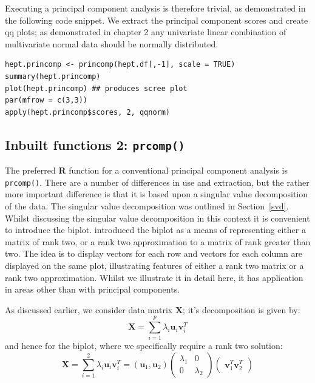 Executing a principal component analysis is therefore trivial, as demonstrated in the following code snippet.   We extract the principal component scores and create qq plots; as demonstrated in chapter 2 any univariate linear combination of multivariate normal data should be normally distributed.  

\singlespacing
\begin{verbatim}
hept.princomp <- princomp(hept.df[,-1], scale = TRUE)
summary(hept.princomp)
plot(hept.princomp) ## produces scree plot
par(mfrow = c(3,3))
apply(hept.princomp$scores, 2, qqnorm)
\end{verbatim}
\onehalfspacing


\subsection{Inbuilt functions 2: \texttt{prcomp()}}
\label{prcomp}

The preferred \textbf{R} function for a conventional principal component analysis is \verb+prcomp()+.   There are a number of differences in use and extraction, but the rather more important difference is that it is based upon a singular value decomposition of the data.   The singular value decomposition was outlined in Section~\ref{svd}.   Whilst discussing the singular value decomposition in this context it is convenient to introduce the biplot.   \cite{Gabriel:1971} introduced the biplot as a means of representing either a matrix of rank two, or a rank two approximation to a matrix of rank greater than two.   The idea is to display vectors for each row and vectors for each column are displayed on the same plot, illustrating features of either a rank two matrix or a rank two approximation.   Whilst we illustrate it in detail here, it has application in areas other than with principal components.

As discussed earlier, we consider data matrix $\boldsymbol{X}$; it's decomposition is given by:
\begin{displaymath}
\boldsymbol{X} = \sum_{i=1}^{p} \lambda_{i} \boldsymbol{u}_{i} \boldsymbol{v}_{i}^{T}
\end{displaymath}
and hence for the biplot, where we specifically require a rank two solution:
\begin{displaymath}
\boldsymbol{X} = \sum_{i=1}^{2} \lambda_{i} \boldsymbol{u}_{i} \boldsymbol{v}_{i}^{T} = 
\left( \boldsymbol{u}_{1},  \boldsymbol{u}_{2} \right) 
\left( \begin{array}{cc} \lambda_{1} & 0 \\ 0 & \lambda_{2} \end{array} \right) \left( \begin{array}{c} \boldsymbol{v}_{1}^{T} \boldsymbol{v}_{2}^{T} \end{array} \right)
\end{displaymath}

